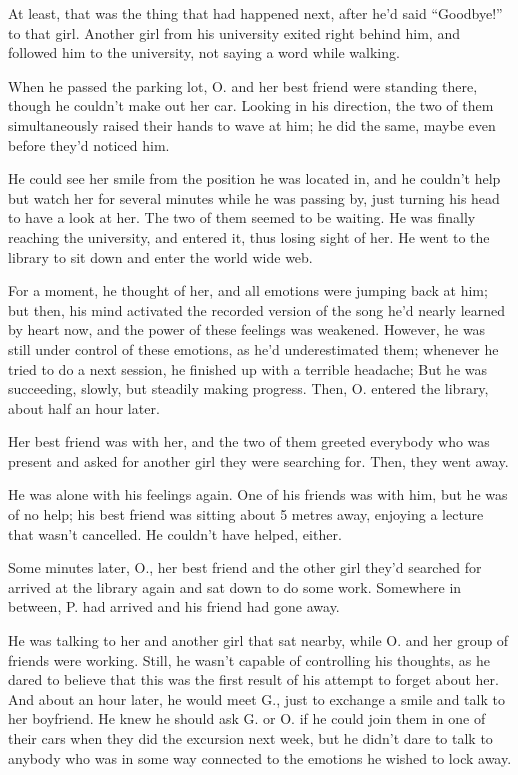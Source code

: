 At least, that was the thing that had happened next, after he'd said \enquote{Goodbye!} to that girl. 
Another girl from his university exited right behind him, and followed him to the university, not saying a word while walking.

When he passed the parking lot, O. and her best friend were standing there, though he couldn't make out her car. Looking in his direction, the two of them simultaneously raised their hands to wave at him; he did the same, maybe even before they'd noticed him.

He could see her smile from the position he was located in, and he couldn't help but watch her for several minutes while he was passing by, just turning his head to have a look at her. 
The two of them seemed to be waiting. 
He was finally reaching the university, and entered it, thus losing sight of her. 
He went to the library to sit down and enter the world wide web.

For a moment, he thought of her, and all emotions were jumping back at him; but then, his mind activated the recorded version of the song he'd nearly learned by heart now, and the power of these feelings was weakened. 
However, he was still under control of these emotions, as he'd underestimated them; whenever he tried to do a next session, he finished up with a terrible headache; But he was succeeding, slowly, but steadily making progress. 
Then, O. entered the library, about half an hour later.

Her best friend was with her, and the two of them greeted everybody who was present and asked for another girl they were searching for. 
Then, they went away.

He was alone with his feelings again. 
One of his friends was with him, but he was of no help; his best friend was sitting about 5 metres away, enjoying a lecture that wasn't cancelled. 
He couldn't have helped, either.

Some minutes later, O., her best friend and the other girl they'd searched for arrived at the library again and sat down to do some work. 
Somewhere in between, P. had arrived and his friend had gone away.

He was talking to her and another girl that sat nearby, while O. and her group of friends were working. 
Still, he wasn't capable of controlling his thoughts, as he dared to believe that this was the first result of his attempt to forget about her. 
And about an hour later, he would meet G., just to exchange a smile and talk to her boyfriend. 
He knew he should ask G. or O. if he could join them in one of their cars when they did the excursion next week, but he didn't dare to talk to anybody who was in some way connected to the emotions he wished to lock away.

